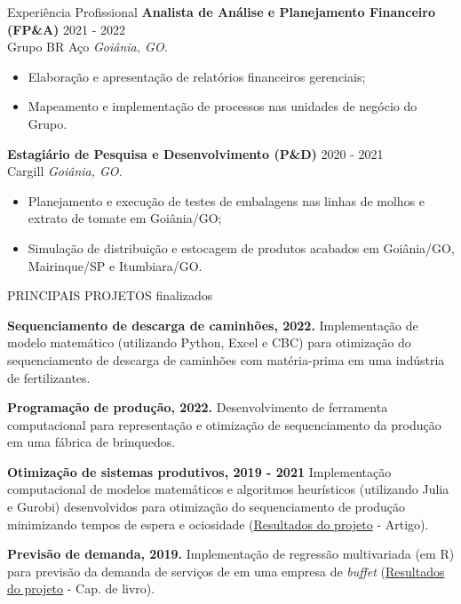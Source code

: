 \documentclass{resume} %
\begin{document}
\begin{rSection}{Experiência Profissional}
\textbf{Analista de Análise e Planejamento Financeiro (FP\&A)} \hfill 2021 - 2022\\
Grupo BR Aço \hfill \textit{Goiânia, GO.}
 \begin{itemize}
    \itemsep -10pt {}
    \item Elaboração e apresentação de relatórios financeiros gerenciais;
    \item Mapeamento e implementação de processos nas unidades de negócio do Grupo.
 \end{itemize}
 
\textbf{Estagiário de Pesquisa e Desenvolvimento (P\&D)} \hfill 2020 - 2021\\
Cargill \hfill \textit{Goiânia, GO.}
 \begin{itemize}
    \itemsep -10pt {}
    \item Planejamento e execução de testes de embalagens nas linhas de molhos e extrato de tomate em Goiânia/GO;
    \item Simulação de distribuição e estocagem de produtos acabados em Goiânia/GO, Mairinque/SP e Itumbiara/GO.
 \end{itemize}

\end{rSection} 


\begin{rSection}{PRINCIPAIS PROJETOS finalizados}
\vspace{-1.25em}
\item {\bf Sequenciamento de descarga de caminhões, 2022.}
{Implementação de modelo matemático (utilizando Python, Excel e CBC) para otimização do sequenciamento de descarga de caminhões com matéria-prima em uma indústria de fertilizantes.}

\item {\bf Programação de produção, 2022.}
{Desenvolvimento de ferramenta computacional para representação e otimização de sequenciamento da produção em uma fábrica de brinquedos.}

\item {\bf Otimização de sistemas produtivos, 2019 - 2021}
{Implementação computacional de modelos matemáticos e algoritmos heurísticos (utilizando Julia e Gurobi) desenvolvidos para otimização do sequenciamento de produção minimizando tempos de espera e ociosidade (\href{https://doi.org/10.1016/j.cie.2022.107976}{Resultados do projeto} - Artigo).}

\item {\bf Previsão de demanda, 2019.}
{Implementação de regressão multivariada (em R) para previsão da demanda de serviços de em uma empresa de {\it buffet} (\href{https://www.poisson.com.br/livros/producao/foco53/Gestao_da_producao_em_foco_vol53.pdf#page=98}{Resultados do projeto} - Cap. de livro).}

\end{rSection} 
\end{document}
